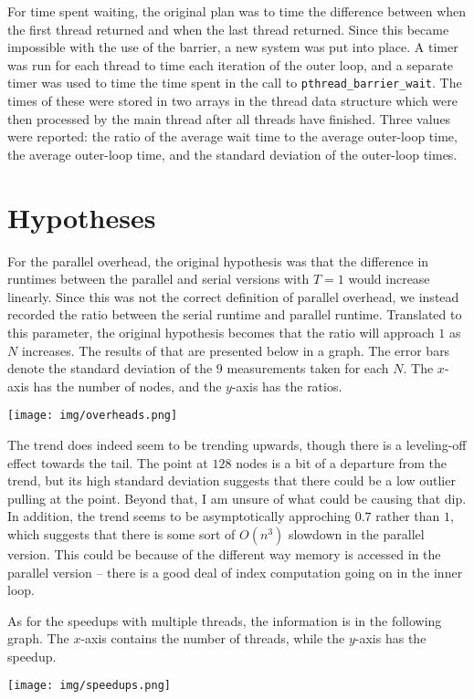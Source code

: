 \documentclass{article}
\begin{document}
For time spent waiting, the original plan was to time the difference between when the first thread returned and when the last thread returned. Since this became impossible with the use of the barrier, a new system was put into place. A timer was run for each thread to time each iteration of the outer loop, and a separate timer was used to time the time spent in the call to \verb|pthread_barrier_wait|. The times of these were stored in two arrays in the thread data structure which were then processed by the main thread after all threads have finished. Three values were reported: the ratio of the average wait time to the average outer-loop time, the average outer-loop time, and the standard deviation of the outer-loop times. 
\section*{Hypotheses}
For the parallel overhead, the original hypothesis was that the difference in runtimes between the parallel and serial versions with $T=1$ would increase linearly. Since this was not the correct definition of parallel overhead, we instead recorded the ratio between the serial runtime and parallel runtime. Translated to this parameter, the original hypothesis becomes that the ratio will approach $1$ as $N$ increases. The results of that are presented below in a graph. The error bars denote the standard deviation of the $9$ measurements taken for each $N$. The $x$-axis has the number of nodes, and the $y$-axis has the ratios.

\texttt{[image: img/overheads.png]}

The trend does indeed seem to be trending upwards, though there is a leveling-off effect towards the tail. The point at $128$ nodes is a bit of a departure from the trend, but its high standard deviation suggests that there could be a low outlier pulling at the point. Beyond that, I am unsure of what could be causing that dip. In addition, the trend seems to be asymptotically approching $0.7$ rather than $1$, which suggests that there is some sort of $O(n^3)$ slowdown in the parallel version. This could be because of the different way memory is accessed in the parallel version -- there is a good deal of index computation going on in the inner loop.

As for the speedups with multiple threads, the information is in the following graph. The $x$-axis contains the number of threads, while the $y$-axis has the speedup.

\texttt{[image: img/speedups.png]}
\end{document}
